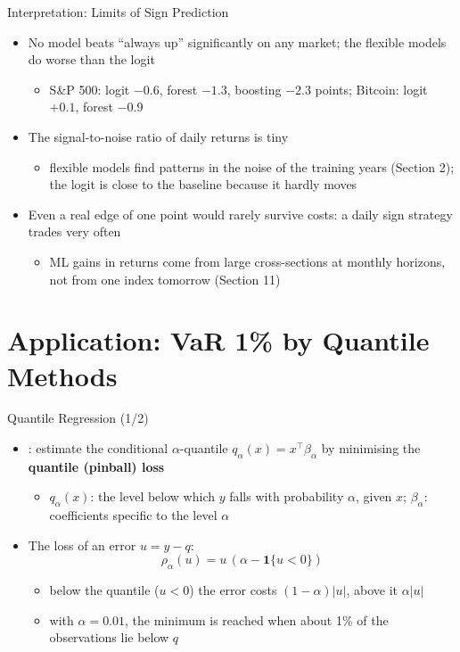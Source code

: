 \begin{frame}{Interpretation: Limits of Sign Prediction}
\itemsize{\small}
\begin{itemize}
    \item No model beats ``always up'' significantly on any market; the flexible models do worse than the logit
    \begin{itemize}
        \item S\&P 500: logit $-0.6$, forest $-1.3$, boosting $-2.3$ points; Bitcoin: logit $+0.1$, forest $-0.9$
    \end{itemize}
    \item The signal-to-noise ratio of daily returns is tiny
    \begin{itemize}
        \item flexible models find patterns in the noise of the training years (Section 2); the logit is close to the baseline because it hardly moves
    \end{itemize}
    \item Even a real edge of one point would rarely survive costs: a daily sign strategy trades very often
    \begin{itemize}
        \item ML gains in returns come from large cross-sections at monthly horizons, not from one index tomorrow (Section 11)
    \end{itemize}
\end{itemize}
\end{frame}


\section{Application: VaR 1\% by Quantile Methods}

\begin{frame}{Quantile Regression (1/2)}
\itemsize{\small}
\begin{itemize}
    \item {}: estimate the conditional $\alpha$-quantile $q_\alpha(x) = x^\top\beta_\alpha$ by minimising the \textbf{quantile (pinball) loss}
    \begin{itemize}
        \item $q_\alpha(x)$: the level below which $y$ falls with probability $\alpha$, given $x$; $\beta_\alpha$: coefficients specific to the level $\alpha$
    \end{itemize}
    \item The loss of an error $u = y - q$: \[ \rho_\alpha(u) = u\,(\alpha - \mathbf{1}\{u < 0\}) \]
    \begin{itemize}
        \item below the quantile ($u < 0$) the error costs $(1 - \alpha)|u|$, above it $\alpha|u|$
        \item with $\alpha = 0.01$, the minimum is reached when about 1\% of the observations lie below $q$
    \end{itemize}
\end{itemize}
\end{frame}

